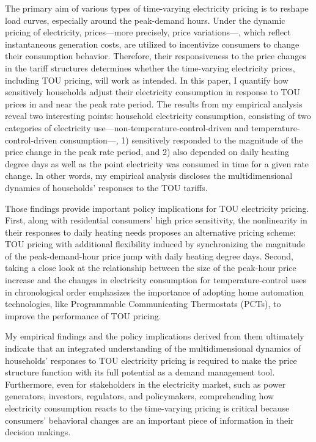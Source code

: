The primary aim of various types of time-varying electricity pricing is to reshape load curves, especially around the peak-demand hours. Under the dynamic pricing of electricity, prices---more precisely, price variations---, which reflect instantaneous generation costs, are utilized to incentivize consumers to change their consumption behavior. Therefore, their responsiveness to the price changes in the tariff structures determines whether the time-varying electricity prices, including TOU pricing, will work as intended. In this paper, I quantify how sensitively households adjust their electricity consumption in response to TOU prices in and near the peak rate period. The results from my empirical analysis reveal two interesting points: household electricity consumption, consisting of two categories of electricity use---non-temperature-control-driven and temperature-control-driven consumption---, 1) sensitively responded to the magnitude of the price change in the peak rate period, and 2) also depended on daily heating degree days as well as the point electricity was consumed in time for a given rate change. In other words, my empirical analysis discloses the multidimensional dynamics of households' responses to the TOU tariffs. 

Those findings provide important policy implications for TOU electricity pricing. First, along with residential consumers' high price sensitivity, the nonlinearity in their responses to daily heating needs proposes an alternative pricing scheme: TOU pricing with additional flexibility induced by synchronizing the magnitude of the peak-demand-hour price jump with daily heating degree days. Second, taking a close look at the relationship between the size of the peak-hour price increase and the changes in electricity consumption for temperature-control uses in chronological order emphasizes the importance of adopting home automation technologies, like Programmable Communicating Thermostats (PCTs), to improve the performance of TOU pricing. 

My empirical findings and the policy implications derived from them ultimately indicate that an integrated understanding of the multidimensional dynamics of households' responses to TOU electricity pricing is required to make the price structure function with its full potential as a demand management tool. Furthermore, even for stakeholders in the electricity market, such as power generators, investors, regulators, and policymakers, comprehending how electricity consumption reacts to the time-varying pricing is critical because consumers' behavioral changes are an important piece of information in their decision makings.
